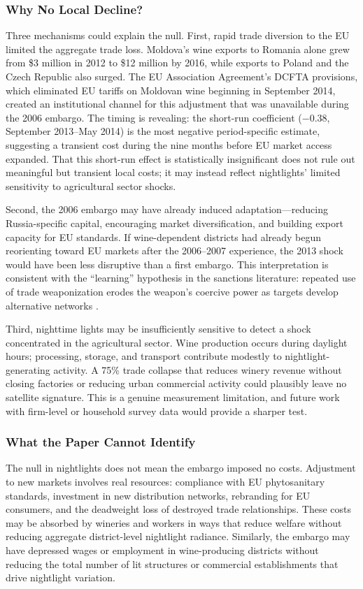 \documentclass[12pt]{article}
\begin{document}
\subsubsection*{Why No Local Decline?} Three mechanisms could explain the null. First, rapid trade diversion to the EU limited the aggregate trade loss. Moldova's wine exports to Romania alone grew from \$3 million in 2012 to \$12 million by 2016, while exports to Poland and the Czech Republic also surged. The EU Association Agreement's DCFTA provisions, which eliminated EU tariffs on Moldovan wine beginning in September 2014, created an institutional channel for this adjustment that was unavailable during the 2006 embargo. The timing is revealing: the short-run coefficient ($-0.38$, September 2013--May 2014) is the most negative period-specific estimate, suggesting a transient cost during the nine months before EU market access expanded. That this short-run effect is statistically insignificant does not rule out meaningful but transient local costs; it may instead reflect nightlights' limited sensitivity to agricultural sector shocks.

Second, the 2006 embargo may have already induced adaptation---reducing Russia-specific capital, encouraging market diversification, and building export capacity for EU standards. If wine-dependent districts had already begun reorienting toward EU markets after the 2006--2007 experience, the 2013 shock would have been less disruptive than a first embargo. This interpretation is consistent with the ``learning'' hypothesis in the sanctions literature: repeated use of trade weaponization erodes the weapon's coercive power as targets develop alternative networks \citep{hufbauer2007economic}.

Third, nighttime lights may be insufficiently sensitive to detect a shock concentrated in the agricultural sector. Wine production occurs during daylight hours; processing, storage, and transport contribute modestly to nightlight-generating activity. A 75\% trade collapse that reduces winery revenue without closing factories or reducing urban commercial activity could plausibly leave no satellite signature. This is a genuine measurement limitation, and future work with firm-level or household survey data would provide a sharper test.

\subsubsection*{What the Paper Cannot Identify} The null in nightlights does not mean the embargo imposed no costs. Adjustment to new markets involves real resources: compliance with EU phytosanitary standards, investment in new distribution networks, rebranding for EU consumers, and the deadweight loss of destroyed trade relationships. These costs may be absorbed by wineries and workers in ways that reduce welfare without reducing aggregate district-level nightlight radiance. Similarly, the embargo may have depressed wages or employment in wine-producing districts without reducing the total number of lit structures or commercial establishments that drive nightlight variation.
\end{document}
